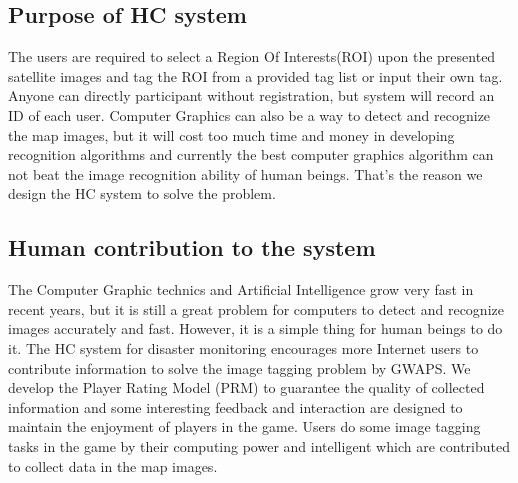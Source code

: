 \subsection{Purpose of HC system}
		The users are required to select a Region Of Interests(ROI) upon the presented satellite images and tag the ROI from a provided tag list or input their own tag. Anyone can directly participant without registration, but system will record an ID of each user.
		Computer Graphics can also be a way to detect and recognize the map images, but it will cost too much time and money in developing recognition algorithms and currently the best computer graphics algorithm can not beat the image recognition ability of human beings. That's the reason we design the HC system to solve the problem.
\subsection{Human contribution to the system}
		The Computer Graphic technics and Artificial Intelligence grow very fast in recent years, but it is still a great problem for computers to detect and recognize images accurately and fast. However, it is a simple thing for human beings to do it.
		The HC system for disaster monitoring encourages more Internet users to contribute information to solve the image tagging problem by GWAPS. We develop the Player Rating Model (PRM) to guarantee the quality of collected information and some interesting feedback and interaction are designed to maintain the enjoyment of players in the game.
		Users do some image tagging tasks in the game by their computing power and intelligent which are contributed to collect data in the map images.

